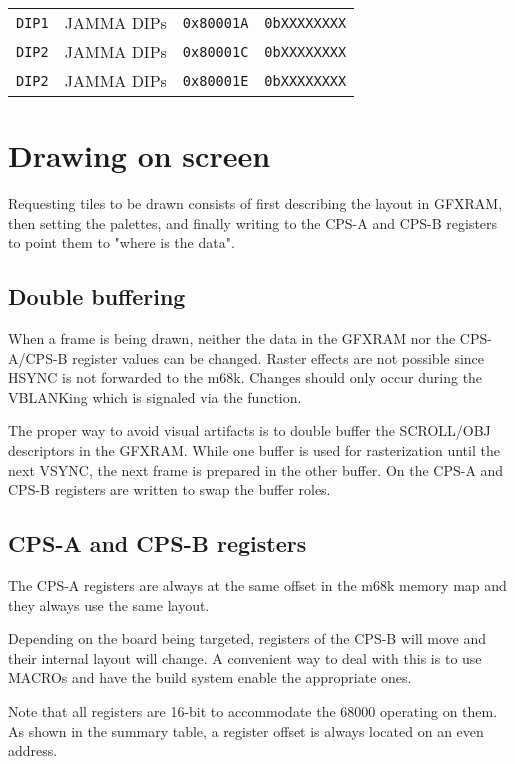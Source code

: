\begin{tabularx}{\textwidth}{Xllr}
    \toprule   
    \texttt{DIP1} & JAMMA DIPs &  \texttt{0x80001A}    &  \texttt{0bXXXXXXXX}    \\      
    \texttt{DIP2} & JAMMA DIPs &  \texttt{0x80001C}    &  \texttt{0bXXXXXXXX}    \\      
    \texttt{DIP2} & JAMMA DIPs &  \texttt{0x80001E}    &  \texttt{0bXXXXXXXX}    \\      
  \toprule   
\end{tabularx}

\section{Drawing on screen}
Requesting tiles to be drawn consists of first describing the layout in GFXRAM, then setting the palettes, and finally writing to the CPS-A and CPS-B registers to point them to "where is the data".

\subsection{Double buffering}
When a frame is being drawn, neither the data in the GFXRAM nor the CPS-A/CPS-B register values can be changed. Raster effects are not possible since HSYNC is not forwarded to the m68k. Changes should only occur during the VBLANKing which is signaled via the  function.

The proper way to avoid visual artifacts is to double buffer the SCROLL/OBJ descriptors in the GFXRAM. While one buffer is used for rasterization until the next VSYNC, the next frame is prepared in the other buffer. On  the CPS-A and CPS-B registers are written to swap the buffer roles.

\subsection{CPS-A and CPS-B registers}
The CPS-A registers are always at the same offset in the m68k memory map and they always use the same layout. 

Depending on the board being targeted, registers of the CPS-B will move and their internal layout will change. A convenient way to deal with this is to use MACROs and have the build system enable the appropriate ones.

Note that all registers are 16-bit to accommodate the 68000 operating on them. As shown in the summary table, a register offset is always located on an even address.

